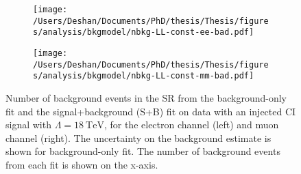 \begin{figure}[h!]
    \centering
    \begin{subfigure}[b]{0.49\textwidth}
        \centering
        \texttt{[image: /Users/Deshan/Documents/PhD/thesis/Thesis/figures/analysis/bkgmodel/nbkg-LL-const-ee-bad.pdf]}
        \label{fig:bkgmodel:fitsbplusb1bad}
    \end{subfigure}
    \begin{subfigure}[b]{0.49\textwidth}
        \centering
        \texttt{[image: /Users/Deshan/Documents/PhD/thesis/Thesis/figures/analysis/bkgmodel/nbkg-LL-const-mm-bad.pdf]}
        \label{fig:bkgmodel:fitsbplusb2bad}
    \end{subfigure}
    \caption[Background estimation comparisons of the signal+background fit and background only fit in an invalid CR choice.]{Number of background events in the SR from the background-only fit and the signal+background (S+B) fit on data with an injected CI signal with $\Lambda = \SI{18}{\tera\electronvolt}$, for the electron channel (left) and muon channel (right). The uncertainty on the background estimate is shown for background-only fit. The number of background events from each fit is shown on the x-axis.}
    \label{fig:bkgmodel:fitsbplusbbad}
\end{figure}